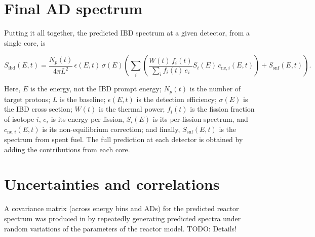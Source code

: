 \documentclass[../thesis.tex]{subfiles}
\begin{document}

\section{Final AD spectrum}
\label{sec:adspectra}

Putting it all together, the predicted IBD spectrum at a given detector, from a single core, is

\begin{samepage}
  \[ S_{\mathrm{ibd}}(E, t) = \frac{N_p(t)}{4\pi L^2} \, \epsilon(E, t) \,
    \sigma(E) \left( \sum_i \left( \frac{W(t) \, f_i(t)}{\sum_i f_i(t) \, e_i}
        S_i(E) \, c_{\mathrm{ne},i}(E, t) \right) + S_{\mathrm{snf}}(E, t)
    \right). \]

  Here, $E$ is the \nubar energy, not the IBD prompt energy; $N_p(t)$ is the number of target protons; $L$ is the baseline; $\epsilon(E, t)$ is the detection efficiency; $\sigma(E)$ is the IBD cross section; $W(t)$ is the thermal power; $f_i(t)$ is the fission fraction of isotope $i$, $e_i$ is its energy per fission, $S_i(E)$ is its per-fission spectrum, and $c_{\mathrm{ne},i}(E, t)$ is its non-equilibrium correction; and finally, $S_\mathrm{snf}(E, t)$ is the spectrum from spent fuel. The full prediction at each detector is obtained by adding the contributions from each core.
\end{samepage}

\section{Uncertainties and correlations}
\label{sec:reacunccorr}

A covariance matrix (across energy bins and ADs) for the predicted reactor spectrum was produced in \cite{Lewis} by repeatedly generating predicted spectra under random variations of the parameters of the reactor model. TODO: Details!
\end{document}

